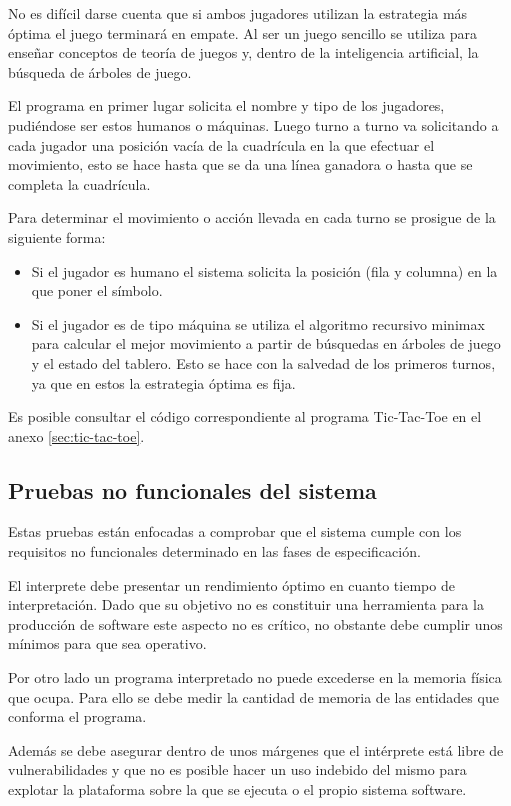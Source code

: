 No es difícil darse cuenta que si ambos jugadores utilizan la estrategia más óptima el juego terminará en empate. Al ser un juego sencillo se 
utiliza para enseñar conceptos de teoría de juegos y, dentro de la inteligencia artificial, la búsqueda de árboles de juego.

El programa en primer lugar solicita el nombre y tipo de los jugadores, pudiéndose ser estos humanos o máquinas. Luego turno a turno va solicitando 
a cada jugador una posición vacía de la cuadrícula en la que efectuar el movimiento, esto se hace hasta que se da una línea ganadora o hasta que se
completa la cuadrícula. 

Para determinar el movimiento o acción llevada en cada turno se prosigue de la siguiente forma:
\begin{itemize} 
\item Si el jugador es humano el sistema solicita la posición (fila y columna) en la que poner el símbolo. 
\item Si el jugador es de tipo máquina se utiliza el algoritmo recursivo minimax para calcular el mejor 
movimiento a partir de búsquedas en árboles de juego y el estado del tablero. Esto se hace con la salvedad de los primeros turnos, ya 
que en estos la estrategia óptima es fija.
\end{itemize}

Es posible consultar el código correspondiente al programa Tic-Tac-Toe en el anexo \ref{sec:tic-tac-toe}.

\subsection{Pruebas no funcionales del sistema}
Estas pruebas están enfocadas a comprobar que el sistema cumple con los requisitos 
no funcionales determinado en las fases de especificación.

El interprete debe presentar un rendimiento óptimo en cuanto tiempo de interpretación. 
Dado que su objetivo no es constituir una herramienta para la producción de software este 
aspecto no es crítico, no obstante debe cumplir unos mínimos para que sea operativo.

Por otro lado un programa interpretado no puede excederse en la memoria física que ocupa. Para ello 
se debe medir la cantidad de memoria de las entidades que conforma el programa.

Además se debe asegurar dentro de unos márgenes que el intérprete está libre de vulnerabilidades 
y que no es posible hacer un uso indebido del mismo para explotar la plataforma sobre la que se
ejecuta o el propio sistema software.

